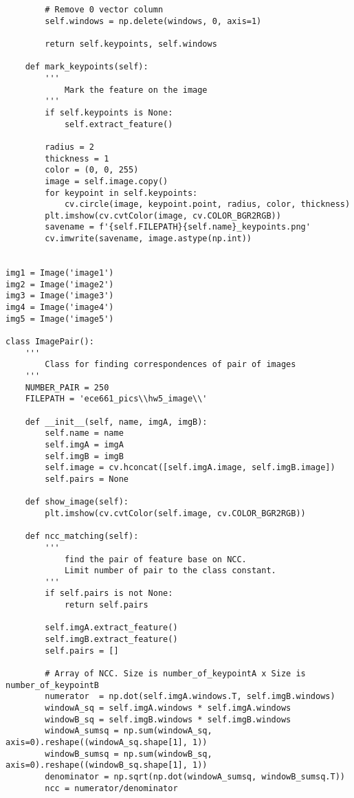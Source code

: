 \documentclass[11pt]{article}
\begin{document}
\begin{lstlisting}
        # Remove 0 vector column
        self.windows = np.delete(windows, 0, axis=1)

        return self.keypoints, self.windows

    def mark_keypoints(self):
        '''
            Mark the feature on the image
        '''
        if self.keypoints is None:
            self.extract_feature()
            
        radius = 2
        thickness = 1
        color = (0, 0, 255)
        image = self.image.copy()
        for keypoint in self.keypoints:
            cv.circle(image, keypoint.point, radius, color, thickness)
        plt.imshow(cv.cvtColor(image, cv.COLOR_BGR2RGB))
        savename = f'{self.FILEPATH}{self.name}_keypoints.png'
        cv.imwrite(savename, image.astype(np.int))


img1 = Image('image1')
img2 = Image('image2')
img3 = Image('image3')
img4 = Image('image4')
img5 = Image('image5')

class ImagePair():
    '''
        Class for finding correspondences of pair of images
    '''
    NUMBER_PAIR = 250
    FILEPATH = 'ece661_pics\\hw5_image\\'

    def __init__(self, name, imgA, imgB):
        self.name = name
        self.imgA = imgA
        self.imgB = imgB
        self.image = cv.hconcat([self.imgA.image, self.imgB.image])
        self.pairs = None
    
    def show_image(self):
        plt.imshow(cv.cvtColor(self.image, cv.COLOR_BGR2RGB))

    def ncc_matching(self):
        '''
            find the pair of feature base on NCC. 
            Limit number of pair to the class constant.
        '''
        if self.pairs is not None:
            return self.pairs
        
        self.imgA.extract_feature()
        self.imgB.extract_feature()
        self.pairs = []
        
        # Array of NCC. Size is number_of_keypointA x Size is number_of_keypointB
        numerator  = np.dot(self.imgA.windows.T, self.imgB.windows)
        windowA_sq = self.imgA.windows * self.imgA.windows
        windowB_sq = self.imgB.windows * self.imgB.windows
        windowA_sumsq = np.sum(windowA_sq, axis=0).reshape((windowA_sq.shape[1], 1))
        windowB_sumsq = np.sum(windowB_sq, axis=0).reshape((windowB_sq.shape[1], 1))
        denominator = np.sqrt(np.dot(windowA_sumsq, windowB_sumsq.T))
        ncc = numerator/denominator


\end{lstlisting}
\end{document}
